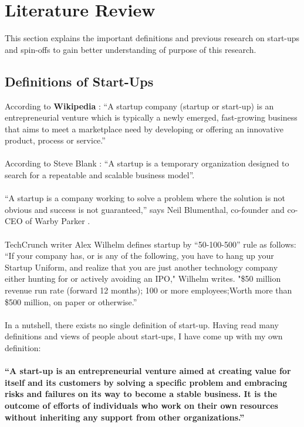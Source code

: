 \chapter{Literature Review\label{cha:chapter2}}

This section explains the important definitions and previous research on start-ups and spin-offs to
gain better understanding of purpose of this research.

\section{Definitions of Start-Ups \label{sec:defs}}
According to \textbf{Wikipedia} \cite{6}:
``A startup company (startup or start-up) is an entrepreneurial venture which is typically a newly
emerged, fast-growing business that aims to meet a marketplace need by developing or offering an
innovative product, process or service.''
\\
\\
According to Steve Blank \cite{8}:
``A startup is a temporary organization designed to search for a repeatable and scalable business
model''.
\\
\\
``A startup is a company working to solve a problem where the solution is not obvious and success
is not guaranteed,'' says Neil Blumenthal, co-founder and co-CEO of Warby Parker \cite{9}.
\\
\\
TechCrunch writer Alex Wilhelm defines startup by ``50-100-500'' rule as follows:
``If your company has, or is any of the following, you have to hang up your Startup Uniform, and
realize that you are just another technology company either hunting for or actively avoiding an
IPO," Wilhelm writes. "\$50 million revenue run rate (forward 12 months); 100 or more
employees;Worth more than \$500 million, on paper or otherwise.'' \cite{10}
\\
\\
In a nutshell, there exists no single definition of start-up. Having read many definitions and views of
people about start-ups, I have come up with my own definition:
\\
\\
\textbf{``A start-up is an entrepreneurial venture aimed at creating value for itself and its customers by
solving a specific problem and embracing risks and failures on its way to become a stable business.
It is the outcome of efforts of individuals who work on their own resources without inheriting any
support from other organizations.''}
\\
\\

